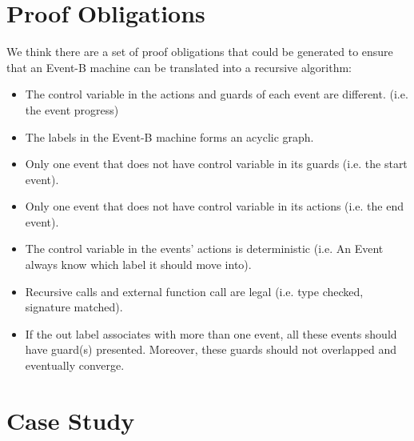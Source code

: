 \documentclass{easychair}
\begin{document}
\section{Proof Obligations}
We think there are a set of proof obligations that could be generated to ensure that an Event-B machine can be translated into a recursive algorithm:
\begin{itemize}
	\item The control variable in the actions and guards of each event are different. (i.e. the event progress)
	\item The labels in the Event-B machine forms an acyclic graph.
	\item Only one event that does not have control variable in its guards (i.e. the start event).
	\item Only one event that does not have control variable in its actions (i.e. the end event).
	\item The control variable in the events' actions is deterministic (i.e. An Event always know which label it should move into).
	\item Recursive calls and external function call are legal (i.e. type checked, signature matched).
	\item If the out label associates with more than one event, all these events should have guard(s) presented. Moreover, these guards should not overlapped and eventually converge.
\end{itemize}

\newpage
\section{Case Study}
\end{document}
